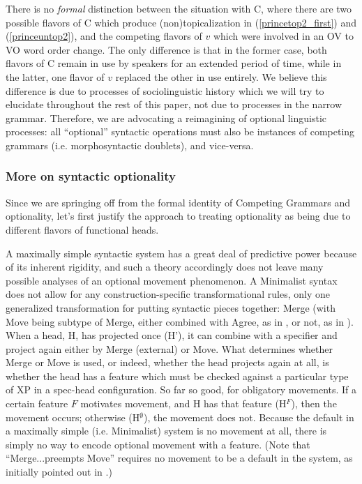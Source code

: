 There is no \emph{formal} distinction between the situation with C, where there are two possible flavors of C which produce (non)topicalization in (\ref{princetop2_first}) and (\ref{princeuntop2}), and the competing flavors of $v$ which were involved in an OV to VO word order change.
The only difference is that in the former case, both flavors of C remain in use by speakers for an extended period of time, while in the latter, one flavor of $v$ replaced the other in use entirely.
We believe this difference is due to processes of sociolinguistic history which we will try to elucidate throughout the rest of this paper, not due to processes in the narrow grammar.
Therefore, we are advocating a reimagining of optional linguistic processes: all ``optional'' syntactic operations must also be instances of competing grammars (i.e. morphosyntactic doublets), and vice-versa.

\subsubsection{More on syntactic optionality}
Since we are springing off from the formal identity of Competing Grammars and optionality, let's first justify the approach to treating optionality as being due to different flavors of functional heads.

A maximally simple syntactic system has a great deal of predictive power because of its inherent rigidity, and such a theory accordingly does not leave many possible analyses of an optional movement phenomenon.
A Minimalist syntax does not allow for any construction-specific transformational rules, only one generalized transformation for putting syntactic pieces together: Merge (with Move being subtype of Merge, either combined with Agree, as in \citealt{chomsky2000}, or not, as in \citealt{chomsky2004, chomsky2008}).
When a head, H, has projected once (H'), it can combine with a specifier and project again either by Merge (external) or Move.
What determines whether Merge or Move is used, or indeed, whether the head projects again at all, is whether the head has a feature which must be checked against a particular type of XP in a spec-head configuration.
So far so good, for obligatory movements.
If a certain feature $F$ motivates movement, and H has that feature (H$^F$), then the movement occurs; otherwise (H$^\emptyset$), the movement does not.
Because the default in a maximally simple (i.e. Minimalist) system is no movement at all, there is simply no way to encode optional movement with a feature.
(Note that ``Merge...preempts Move'' requires no movement to be a default in the system, as initially pointed out in \citealt{chomsky2000}.)


